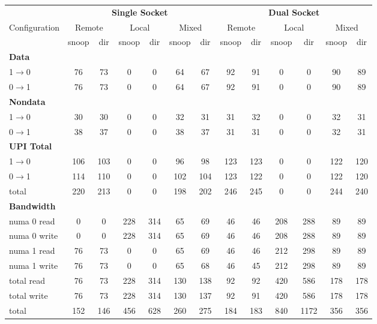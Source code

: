 \begin{table}[t] \centering \small \setlength{\tabcolsep}{5pt}
\renewcommand{\arraystretch}{1.2}

\begin{tabular}{|l|cc|cc|cc||cc|cc|cc|}
\hline

& \multicolumn{6}{c||}{\textbf{Single Socket}}
& \multicolumn{6}{c|}{\textbf{Dual Socket}} \\
\cline{2-13}

Configuration &
\multicolumn{2}{c|}{Remote} &
\multicolumn{2}{c|}{Local} &
\multicolumn{2}{c||}{Mixed} &
\multicolumn{2}{c|}{Remote} &
\multicolumn{2}{c|}{Local} &
\multicolumn{2}{c|}{Mixed} \\
\hline

& snoop & dir
& snoop & dir
& snoop & dir
& snoop & dir
& snoop & dir
& snoop & dir \\
\hline\hline

\multicolumn{13}{|l|}{\textbf{Data}} \\
\hline
1$\rightarrow$0 & 76 & 73 & 0 & 0 & 64 & 67 & 92 & 91 & 0 & 0 & 90 & 89 \\
\hline
0$\rightarrow$1 & 76 & 73 & 0 & 0 & 64 & 67 & 92 & 91 & 0 & 0 & 90 & 89 \\
\hline

\multicolumn{13}{|l|}{\textbf{Nondata}} \\
\hline
1$\rightarrow$0 & 30 & 30 & 0 & 0 & 32 & 31 & 31 & 32 & 0 & 0 & 32 & 31 \\
\hline
0$\rightarrow$1 & 38 & 37 & 0 & 0 & 38 & 37 & 31 & 31 & 0 & 0 & 32 & 31 \\
\hline

\multicolumn{13}{|l|}{\textbf{UPI Total}} \\
\hline
1$\rightarrow$0 & 106 & 103 & 0 & 0 & 96 & 98 & 123 & 123 & 0 & 0 & 122 & 120 \\
\hline
0$\rightarrow$1 & 114 & 110 & 0 & 0 & 102 & 104 & 123 & 122 & 0 & 0 & 122 & 120 \\
\hline
total           & 220 & 213 & 0 & 0 & 198 & 202 & 246 & 245 & 0 & 0 & 244 & 240 \\
\hline

\multicolumn{13}{|l|}{\textbf{Bandwidth}} \\
\hline
numa 0 read     & 0 & 0 & 228 & 314 & 65 & 69 & 46 & 46 & 208 & 288 & 89 & 89 \\
\hline
numa 0 write    & 0 & 0 & 228 & 314 & 65 & 69 & 46 & 46 & 208 & 288 & 89 & 89 \\
\hline
numa 1 read     & 76 & 73 & 0 & 0 & 65 & 69 & 46 & 46 & 212 & 298 & 89 & 89 \\
\hline
numa 1 write    & 76 & 73 & 0 & 0 & 65 & 68 & 46 & 45 & 212 & 298 & 89 & 89 \\
\hline
total read      & 76 & 73 & 228 & 314 & 130 & 138 & 92 & 92 & 420 & 586 & 178 & 178 \\
\hline
total write     & 76 & 73 & 228 & 314 & 130 & 137 & 92 & 91 & 420 & 586 & 178 & 178 \\
\hline
total           & 152 & 146 & 456 & 628 & 260 & 275 & 184 & 183 & 840 & 1172 & 356 & 356 \\
\hline


\end{tabular}
\end{table}
